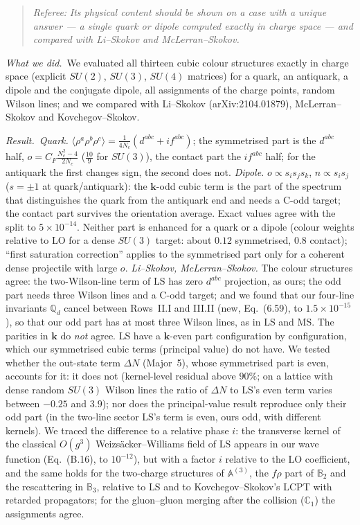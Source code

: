 \documentclass[a4paper,11pt]{article}
\def\v#1{\mathbf{#1}}
\def\mf#1{\mathbb{#1}}
\newcommand{\referee}[1]{\begin{quote}\small\emph{Referee:} \emph{#1}\end{quote}}
\newcommand{\done}{\par\noindent\emph{What we did.}\ }
\newcommand{\result}{\par\noindent\emph{Result.}\ }
\begin{document}
\referee{Its physical content should be shown on a case with a unique answer --- a single quark or dipole computed exactly in charge space --- and compared with Li--Skokov and McLerran--Skokov.}
\done We evaluated all thirteen cubic colour structures exactly in charge space (explicit $SU(2)$, $SU(3)$, $SU(4)$ matrices) for a quark, an antiquark, a dipole and the conjugate dipole, all assignments of the charge points, random Wilson lines; and we compared with Li--Skokov (arXiv:2104.01879), McLerran--Skokov and Kovchegov--Skokov.
\result \emph{Quark.} $\langle\rho^a\rho^b\rho^c\rangle=\frac{1}{4N_c}(d^{abc}+if^{abc})$; the symmetrised part is the $d^{abc}$ half, $o=C_F\frac{N_c^2-4}{2N_c}$ ($\frac{10}{9}$ for $SU(3)$), the contact part the $if^{abc}$ half; for the antiquark the first changes sign, the second does not. \emph{Dipole.} $o\propto s_is_js_k$, $n\propto s_is_j$ ($s=\pm1$ at quark/antiquark): the $\v k$-odd cubic term is the part of the spectrum that distinguishes the quark from the antiquark end and needs a C-odd target; the contact part survives the orientation average. Exact values agree with the split to $5\times10^{-14}$. Neither part is enhanced for a quark or a dipole (colour weights relative to LO for a dense $SU(3)$ target: about $0.12$ symmetrised, $0.8$ contact); ``first saturation correction'' applies to the symmetrised part only for a coherent dense projectile with large $o$.
\emph{Li--Skokov, McLerran--Skokov.} The colour structures agree: the two-Wilson-line term of LS has zero $d^{abc}$ projection, as ours; the odd part needs three Wilson lines and a C-odd target; and we found that our four-line invariants $\mf Q_d$ cancel between Rows~II.I and III.II (new, Eq.~(6.59), to $1.5\times10^{-15}$), so that our odd part has at most three Wilson lines, as in LS and MS. The parities in $\v k$ do \emph{not} agree. LS have a $\v k$-even part configuration by configuration, which our symmetrised cubic terms (principal value) do not have. We tested whether the out-state term $\Delta N$ (Major~5), whose symmetrised part is even, accounts for it: it does not (kernel-level residual above $90\%$; on a lattice with dense random $SU(3)$ Wilson lines the ratio of $\Delta N$ to LS's even term varies between $-0.25$ and $3.9$); nor does the principal-value result reproduce only their odd part (in the two-line sector LS's term is even, ours odd, with different kernels). We traced the difference to a relative phase $i$: the transverse kernel of the classical $O(g^3)$ Weizs\"acker--Williams field of LS appears in our wave function (Eq.~(B.16), to $10^{-12}$), but with a factor $i$ relative to the LO coefficient, and the same holds for the two-charge structures of $\mf A^{(3)}$, the $f\rho$ part of $\mf B_2$ and the rescattering in $\mf B_3$, relative to LS and to Kovchegov--Skokov's LCPT with retarded propagators; for the gluon--gluon merging after the collision ($\mf C_1$) the assignments agree.
\end{document}
